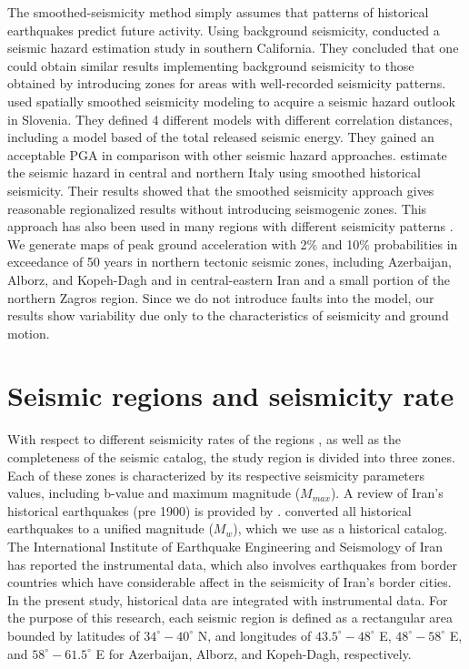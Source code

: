 The smoothed-seismicity method simply assumes that patterns of historical earthquakes predict future activity. Using background seismicity, \citet{Cao1996} conducted a seismic hazard estimation study in southern California. They concluded that one could obtain similar results implementing background seismicity to those obtained by introducing zones for areas with well-recorded seismicity patterns. \citet{Lapajne1997} used spatially smoothed seismicity modeling to acquire a seismic hazard outlook in Slovenia. They defined 4 different models with different correlation distances, including a model based of the total released seismic energy. They gained an acceptable PGA in comparison with other seismic hazard approaches. \citet{Akinci2004} estimate the seismic hazard in central and northern Italy using smoothed historical seismicity. Their results showed that the smoothed seismicity approach gives reasonable regionalized results without introducing seismogenic zones. This approach has also been used in many regions with different seismicity patterns \citep{Wesson1999, Klein2001, Hamdache2008, Kalkan2009, Moschetti2014, Boyd2008}. We generate maps of peak ground acceleration with 2\% and 10\% probabilities in exceedance of 50 years in northern tectonic seismic zones, including Azerbaijan, Alborz, and Kopeh-Dagh and in central-eastern Iran and a small portion of the northern Zagros region. Since we do not introduce faults into the model, our results show variability due only to the characteristics of seismicity and ground motion. 



\section{Seismic regions and seismicity rate}
With respect to different seismicity rates of the regions \cite{Nemati2015}, as well as the completeness of the seismic catalog, the study region is divided into three zones. Each of these zones is characterized by its respective seismicity parameters values, including b-value and maximum magnitude ($M{_{max}}$). A review of Iran's historical earthquakes (pre 1900) is provided by \citet{Ambraseys2005}. \citet{Karimiparidari2013} converted all historical earthquakes to a unified magnitude ($M_w$), which we use as a historical catalog. The International Institute of Earthquake Engineering and Seismology of Iran \citep{IIEES} has reported the instrumental data, which also involves earthquakes from border countries which have considerable affect in the seismicity of Iran's border cities. 
In the present study, historical data are integrated with instrumental data. For the purpose of this research, each seismic region is defined as a rectangular area bounded by latitudes of $34^{\circ}-40^{\circ}$ N, and longitudes of $43.5^{\circ}-48^{\circ}$ E, $48^{\circ}-58^{\circ}$ E, and $58^{\circ}-61.5^{\circ}$ E for Azerbaijan, Alborz, and Kopeh-Dagh, respectively. 

